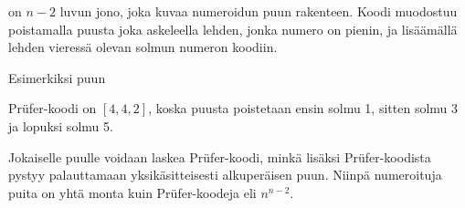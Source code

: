 
 on $n-2$ luvun jono,
joka kuvaa numeroidun puun rakenteen.
Koodi muodostuu poistamalla puusta
joka askeleella lehden, jonka numero on pienin,
ja lisäämällä lehden vieressä olevan solmun
numeron koodiin.

Esimerkiksi puun
\begin{center}
\end{center}
Prüfer-koodi on $[4,4,2]$,
koska puusta poistetaan ensin solmu 1,
sitten solmu 3 ja lopuksi solmu 5.

Jokaiselle puulle voidaan laskea
Prüfer-koodi, minkä lisäksi
Prüfer-koodista pystyy palauttamaan
yksikäsitteisesti alkuperäisen puun.
Niinpä numeroituja puita on yhtä monta
kuin Prüfer-koodeja eli $n^{n-2}$.

